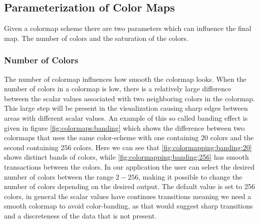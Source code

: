 \subsection{Parameterization of Color Maps}
\label{ss:colormaps:parameterization}
Given a colormap scheme there are two parameters which can influence the final map. The number of colors and the saturation of the colors.

\subsubsection{Number of Colors} %
\label{ssub:number_of_colors}
The number of colormap influences how smooth the colormap looks. When the number of colors in a colormap is low, there is a relatively large difference between the scalar values associated with two neighboring colors in the colormap. This large step will be present in the visualization causing sharp edges between areas with different scalar values. An example of this so called banding effect is given in figure \ref{fig:colormaps:banding} which shows the difference between two colormaps that uses the same color-scheme with one containing 20 colors and the second containing 256 colors. Here we can see that \cref{fig:colormapping:banding:20} shows distinct bands of colors, while \cref{fig:colormapping:banding:256} has smooth transactions between the colors. In our application the user can select the desired number of colors between the range $2 - 256$, making it possible to change the number of colors depending on the desired output. The default value is set to 256 colors, in general the scalar values have continues transitions meaning we need a smooth colormap to avoid color-banding, as that would suggest sharp transitions and a discreteness of the data that is not present.
